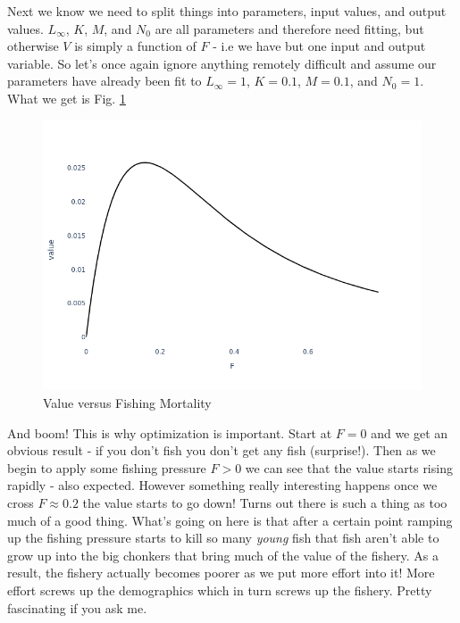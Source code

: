 \documentclass[11pt,a5paper]{book}
\begin{document}
Next we know we need to split things into parameters, input values, and output values. $L_\infty$, $K$, $M$, and $N_0$ are all parameters and therefore need fitting, but otherwise $V$ is simply a function of $F$ - i.e we have but one input and output variable. So let's once again ignore anything remotely difficult and assume our parameters have already been fit to $L_\infty=1$, $K=0.1$, $M=0.1$, and $N_0=1$. What we get is Fig. \ref{fig:value_v_F}
\newline

\begin{figure}[h!] 
  \includegraphics[width=\linewidth]{notebooks/SimpleOptimization/value_v_F.png}
  \caption{Value versus Fishing Mortality}
  \label{fig:value_v_F}
\end{figure}

And boom! This is why optimization is important. Start at $F=0$ and we get an obvious result - if you don't fish you don't get any fish (surprise!). Then as we begin to apply some fishing pressure $F>0$ we can see that the value starts rising rapidly - also expected. However something really interesting happens once we cross $F\approx 0.2$ the value starts to go down! Turns out there is such a thing as too much of a good thing. What's going on here is that after a certain point ramping up the fishing pressure starts to kill so many \textit{young} fish that fish aren't able to grow up into the big chonkers that bring much of the value of the fishery. As a result, the fishery actually becomes poorer as we put more effort into it! More effort screws up the demographics which in turn screws up the fishery. Pretty fascinating if you ask me.  
\newline
\end{document}
